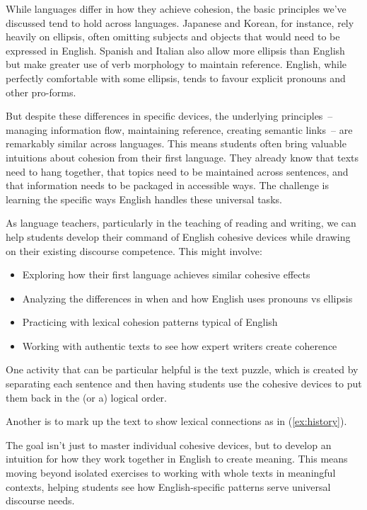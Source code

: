 While languages differ in how they achieve cohesion, the basic principles we've discussed tend to hold across languages. Japanese and Korean, for instance, rely heavily on ellipsis, often omitting subjects and objects that would need to be expressed in English. Spanish and Italian also allow more ellipsis than English but make greater use of verb morphology to maintain reference. English, while perfectly comfortable with some ellipsis, tends to favour explicit pronouns and other pro-forms.

But despite these differences in specific devices, the underlying principles~-- managing information flow, maintaining reference, creating semantic links~-- are remarkably similar across languages. This means students often bring valuable intuitions about cohesion from their first language. They already know that texts need to hang together, that topics need to be maintained across sentences, and that information needs to be packaged in accessible ways. The challenge is learning the specific ways English handles these universal tasks.

As language teachers, particularly in the teaching of reading and writing, we can help students develop their command of English cohesive devices while drawing on their existing discourse competence. This might involve:

\begin{itemize}[noitemsep]
    \item Exploring how their first language achieves similar cohesive effects
    \item Analyzing the differences in when and how English uses pronouns vs ellipsis
    \item Practicing with lexical cohesion patterns typical of English
    \item Working with authentic texts to see how expert writers create coherence
\end{itemize}

One activity that can be particular helpful is the text puzzle, which is created by separating each sentence and then having students use the cohesive devices to put them back in the (or a) logical order.

Another is to mark up the text to show lexical connections as in (\ref{ex:history}). 

The goal isn't just to master individual cohesive devices, but to develop an intuition for how they work together in English to create meaning. This means moving beyond isolated exercises to working with whole texts in meaningful contexts, helping students see how English-specific patterns serve universal discourse needs.

